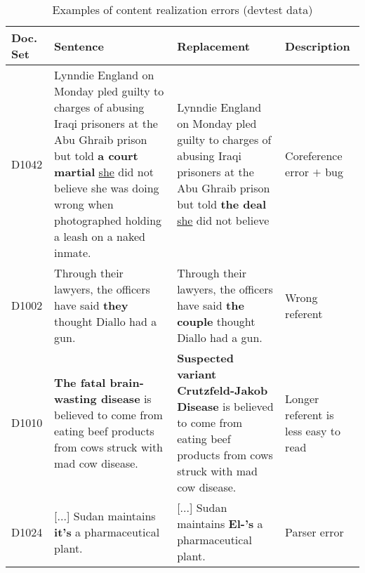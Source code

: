 \begin{table*}[ht]
\centering
\begin{tabular}{|p{1.5cm}|p{5.5cm}|p{5.5cm}|p{2cm}|}
  \hline
Doc. Set & Sentence & Replacement & Description \\
 \hline
    D1042 & Lynndie England on Monday pled guilty to charges of abusing Iraqi prisoners at the Abu Ghraib prison but told \textbf{a court martial} \underline{she} did not believe she was doing wrong when photographed holding a leash on a naked inmate. & Lynndie England on Monday pled guilty to charges of abusing Iraqi prisoners at the Abu Ghraib prison but told \textbf{the deal} \underline{she} did not believe & Coreference error $+$ bug \\ \hline
    D1002 & Through their lawyers, the officers have said \textbf{they} thought Diallo had a gun. & Through their lawyers, the officers have said \textbf{the couple} thought Diallo had a gun. & Wrong referent \\ \hline
    D1010 & \textbf{The fatal brain-wasting disease} is believed to come from eating beef products from cows struck with mad cow disease. & \textbf{Suspected variant Crutzfeld-Jakob Disease} is believed to come from eating beef products from cows struck with mad cow disease. & Longer referent is less easy to read \\ 
    \hline
    D1024 & [...] Sudan maintains \textbf{it's} a pharmaceutical plant. & [...] Sudan maintains \textbf{El-'s} a pharmaceutical plant. & Parser error \\ \hline
\end{tabular}\caption{Examples of content realization errors (devtest data)}
\label{tab:error_analysis_realization}
\end{table*}